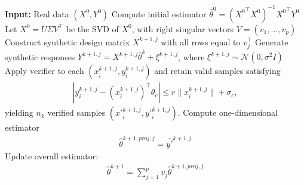 \begin{algorithm}[H]
\caption{Iterative Verifier-Guided Retraining in Linear Regression}
\label{alg:linear_retraining}
\begin{algorithmic}[1]
    \State \textbf{Input:} Real data $(X^0, Y^0)$
    \State Compute initial estimator $\hat{\theta}^0 = ({X^{0}}^\top X^0)^{-1} {X^0}^\top Y^0$
    \State Let $X^0 = U \Sigma V^\top$ be the SVD of $X^0$, with right singular vectors $V = (v_1, \ldots, v_p)$
            \State Construct synthetic design matrix $X^{k+1,j}$ with all rows equal to $v_j^\top$
            \State Generate synthetic responses $Y^{k+1,j} = X^{k+1,j} \hat{\theta}^{k} + \xi^{k+1,j}$, where $\xi^{k+1,j} \sim \mathcal{N}(0, \sigma^2I)$
            \State Apply verifier to each $(x^{k+1,j}_i, y^{k+1,j}_i)$ and retain valid samples satisfying
            \begin{align}\label{equ:linear:verify_condition2}
            |y_i^{k+1,j} - (x_i^{k+1,j})^\top \theta_c| \leq r \|x_i^{k+1,j}\| + \sigma_c,    
            \end{align}
            \State yielding $n_k$ verified samples $(x'^{k+1,j}_i, y'^{k+1,j}_i)$.
            \State Compute one-dimensional estimator
            \begin{align}
            \hat{\theta}^{k+1,proj,j} =  \bar{y'}^{k+1,j}\label{equ:linear:thetak_proj}
            \end{align}
        \EndFor
        \State Update overall estimator:
        \begin{align}
        \hat{\theta}^{k+1} = \sum_{j=1}^p v_j \hat{\theta}^{k+1,proj,j} \label{equ:linear:thetak1}
        \end{align}
    \EndFor
\end{algorithmic}
\end{algorithm}



